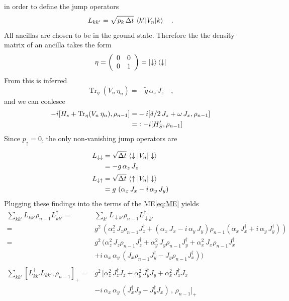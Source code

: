 \documentclass{article}
\begin{document}
in order to define the jump operators
\begin{equation*}
    L_{kk'}=\sqrt{p_k\,\Delta{t}}\,\braket{k'|V_n|k}\quad.
\end{equation*}
All ancillas are chosen to be in the ground state. Therefore the the density matrix of an ancilla takes the form
\begin{equation*}
    \eta=\left(\begin{array}{cc}
      0   & 0 \\
       0  & 1
    \end{array}\right)=\ket{\downarrow}\bra{\downarrow}
\end{equation*}
From this is inferred 
\begin{equation*}
    \operatorname{Tr}_\eta(V_n\,\eta_n)=-\tilde{g}\,\alpha_z\,J_z\quad,
\end{equation*}
and we can coalesce
\begin{align*}
    -i[H_s + \operatorname{Tr}_\eta(V_n\,\eta_n), \rho_{n-1}]=&-i[\delta/2\,J_z+\omega\,J_x,\rho_{n-1}]\\
    =&\vcentcolon-i[H_S',\rho_{n-1}]
\end{align*}
Since $p_\uparrow=0$, the only non-vanishing jump operators are
\begin{align*}
    L_{\downarrow\downarrow}&=\sqrt{\Delta{t}}\,\braket{\downarrow|V_n|\downarrow}\\
    &=-g\,\alpha_z\,J_z\\
    L_{\downarrow\uparrow}&=\sqrt{\Delta{t}}\,\braket{\uparrow|V_n|\downarrow}\\
    &={g}\,\left(\alpha_x\,J_x-i\,\alpha_y\,J_y\right)
\end{align*}
Plugging these findings into the terms of the ME\ref{eq:ME} yields
\begin{align*}
    \sum_{kk'} L_{kk'} \rho_{n-1} L_{kk'}^\dagger=&\sum_{k'} L_{\downarrow{k}'} \rho_{n-1} L_{\downarrow{k}'}^\dagger\\
    =&g^2\,\left(\alpha_z^2\,J_z\rho_{n-1}J_z^\dagger+(\alpha_x\,J_x-i\,\alpha_y\,J_y)\rho_{n-1}(\alpha_x\,J_x^\dagger+i\,\alpha_y\,J_y^\dagger)\right)\\
    =&g^2\,(\alpha_z^2\,J_z\rho_{n-1}J_z^\dagger+\alpha_y^2\,J_y\rho_{n-1}J_y^\dagger+\alpha_x^2\,J_x\rho_{n-1}J_x^\dagger\\
    &+i\,\alpha_x\,\alpha_y\,(J_x\rho_{n-1}J_y^\dagger-J_y\rho_{n-1}J_x^\dagger))\\\\
    \sum_{kk'}\left[L_{kk'}^\dagger L_{kk'}, \rho_{n-1} \right]_+ =   &g^2\,\Big[\alpha_z^2\,J_z^\dagger J_z+\alpha_y^2\,J_y^\dagger J_y+\alpha_x^2\,J_x^\dagger J_x\\
    &-i\,\alpha_x\,\alpha_y\,(J_x^\dagger J_y-J_y^\dagger J_x)\,,\,\rho_{n-1}\Big]_+
\end{align*}
\end{document}
